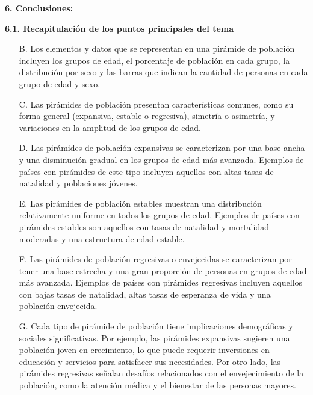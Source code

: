 \documentclass[8pt,a4paper]{beamer}
\begin{document}
{\begin{frame}{\textbf{6. Conclusiones:}}
\begin{block}{\textbf{6.1. Recapitulación de los puntos principales del tema}}
\begin{enumerate}
\item[B.] Los elementos y datos que se representan en una pirámide de población incluyen los grupos de edad, el porcentaje de población en cada grupo, la distribución por sexo y las barras que indican la cantidad de personas en cada grupo de edad y sexo.

\item[C.] Las pirámides de población presentan características comunes, como su forma general (expansiva, estable o regresiva), simetría o asimetría, y variaciones en la amplitud de los grupos de edad.

\end{enumerate}
\end{block}
\end{frame}

\begin{frame}{}
\begin{block}{}
\justifying

\begin{enumerate}
\justifying

\item[D.] Las pirámides de población expansivas se caracterizan por una base ancha y una disminución gradual en los grupos de edad más avanzada. Ejemplos de países con pirámides de este tipo incluyen aquellos con altas tasas de natalidad y poblaciones jóvenes.

\item[E.] Las pirámides de población estables muestran una distribución relativamente uniforme en todos los grupos de edad. Ejemplos de países con pirámides estables son aquellos con tasas de natalidad y mortalidad moderadas y una estructura de edad estable.

\item[F.] Las pirámides de población regresivas o envejecidas se caracterizan por tener una base estrecha y una gran proporción de personas en grupos de edad más avanzada. Ejemplos de países con pirámides regresivas incluyen aquellos con bajas tasas de natalidad, altas tasas de esperanza de vida y una población envejecida.

\item[G.] Cada tipo de pirámide de población tiene implicaciones demográficas y sociales significativas. Por ejemplo, las pirámides expansivas sugieren una población joven en crecimiento, lo que puede requerir inversiones en educación y servicios para satisfacer sus necesidades. Por otro lado, las pirámides regresivas señalan desafíos relacionados con el envejecimiento de la población, como la atención médica y el bienestar de las personas mayores.


\end{enumerate}
\end{block}
\end{frame}}
\end{document}
